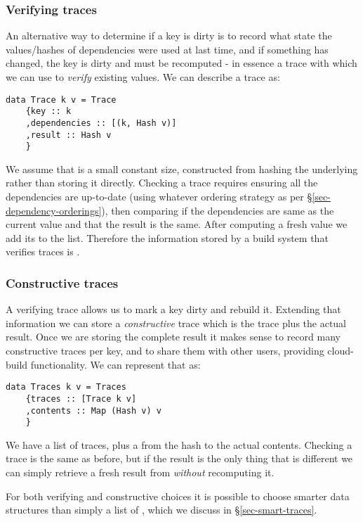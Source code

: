 \subsubsection{Verifying traces}\label{sec-verifying-traces}

An alternative way to determine if a key is dirty is to record what state the values/hashes of dependencies were used at last time, and if something has changed, the key is dirty and must be recomputed - in essence a trace with which we can use to \textit{verify} existing values. We can describe a trace as:

\begin{verbatim}
data Trace k v = Trace
    {key :: k
    ,dependencies :: [(k, Hash v)]
    ,result :: Hash v
    }
\end{verbatim}

We assume that  is a small constant size, constructed from hashing the underlying  rather than storing it directly. Checking a trace requires ensuring all the dependencies are up-to-date (using whatever ordering strategy as per \S\ref{sec-dependency-orderings}), then comparing if the dependencies are same as the current value and that the result is the same. After computing a fresh value we add its  to the list. Therefore the information stored by a build system that verifies traces is \hs{[Trace k v]}.

\subsubsection{Constructive traces}\label{sec-constructive-traces}

A verifying trace allows us to mark a key dirty and rebuild it. Extending that information we can store a \textit{constructive} trace which is the trace plus the actual result. Once we are storing the complete result it makes sense to record many constructive traces per key, and to share them with other users, providing cloud-build functionality. We can represent that as:

\begin{verbatim}
data Traces k v = Traces
    {traces :: [Trace k v]
    ,contents :: Map (Hash v) v
    }
\end{verbatim}

We have a list of traces, plus a  from the hash to the actual contents. Checking a trace is the same as before, but if the result is the only thing that is different we can simply retrieve a fresh result from  \textit{without} recomputing it.

For both verifying and constructive choices it is possible to choose smarter data structures than simply a list of , which we discuss in \S\ref{sec-smart-traces}.

